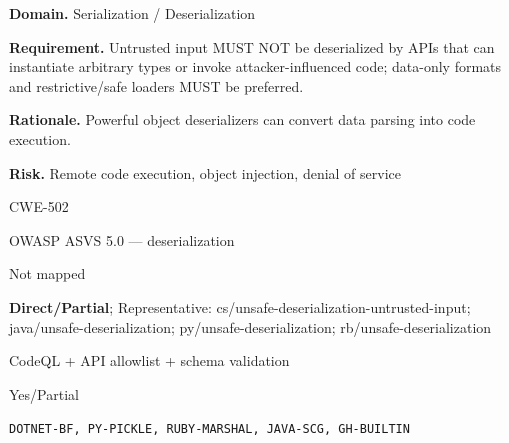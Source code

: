 \documentclass[10pt,letterpaper]{article}
\newcommand{\prioritybadge}[2]{\tcbox[on line,boxrule=0pt,arc=1.2mm,boxsep=0.7mm,left=1mm,right=1mm,top=0.4mm,bottom=0.4mm,colback=#2!12,coltext=#2]{\scriptsize\bfseries #1}}
\begin{document}
\begin{rulebox}[title={\texttt{SCS-ALL-DESER-001} \hfill \prioritybadge{Critical Control}{Critical}}]
\textbf{Domain.} Serialization / Deserialization

\textbf{Requirement.} Untrusted input MUST NOT be deserialized by APIs that can instantiate arbitrary types or invoke attacker-influenced code; data-only formats and restrictive/safe loaders MUST be preferred.

\textbf{Rationale.} Powerful object deserializers can convert data parsing into code execution.

\textbf{Risk.} Remote code execution, object injection, denial of service

\begin{description}[leftmargin=2.65cm,labelwidth=2.3cm,style=nextline,itemsep=1pt,topsep=3pt]
  \item[CWE] CWE-502
  \item[OWASP] OWASP ASVS 5.0 --- deserialization
  \item[CERT] Not mapped
  \item[CodeQL] {\raggedright\textbf{Direct/Partial}; Representative: cs/\allowbreak unsafe-deserialization-untrusted-input; java/\allowbreak unsafe-deserialization; py/\allowbreak unsafe-deserialization; rb/\allowbreak unsafe-deserialization\par}
  \item[Enforcement] CodeQL + API allowlist + schema validation
  \item[Automation] Yes/Partial
  \item[Sources] \texttt{DOTNET-BF, PY-PICKLE, RUBY-MARSHAL, JAVA-SCG, GH-BUILTIN}
\end{description}
\end{rulebox}
\end{document}
